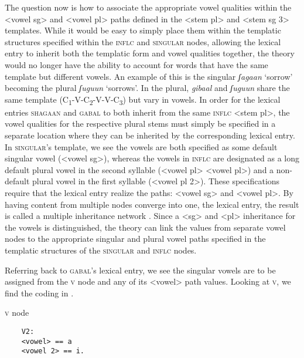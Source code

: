 \documentclass[output=paper,modfonts]{langscibook}
\begin{document}
The question now is how to associate the appropriate vowel qualities within the <vowel sg> and <vowel pl> paths defined in the <stem pl> and <stem sg 3> templates.  While it would be easy to simply place them within the templatic structures specified within the \textsc{inflc} and \textsc{singular} nodes, allowing the lexical entry to inherit both the templatic form and vowel qualities together, the theory would no longer have the ability to account for words that have the same template but different vowels. An example of this is the singular \textit{ʃagaan} ‘sorrow’ becoming the plural \textit{ʃuguun} ‘sorrows’. In the plural, \textit{gibaal} and \textit{ʃuguun} share the same template (C\textsubscript{1}{}-V-C\textsubscript{2}{}-V-V-C\textsubscript{3}) but vary in vowels. In order for the lexical entries \textsc{shagaan} and \textsc{gabal} to both inherit from the same \textsc{inflc} <stem pl>, the vowel qualities for the respective plural stems must simply be specified in a separate location where they can be inherited by the corresponding lexical entry. In \textsc{singular}’s template, we see the vowels are both specified as some default singular vowel (<vowel sg>), whereas the vowels in \textsc{inflc} are designated as a long default plural vowel in the second syllable (<vowel pl> <vowel pl>) and a non-default plural vowel in the first syllable (<vowel pl 2>). These specifications require that the lexical entry realize the paths: <vowel sg> and <vowel pl>. By having content from multiple nodes converge into one, the lexical entry, the result is called a multiple inheritance network \citep[202--203]{Evans1996}. Since a <sg> and <pl> inheritance for the vowels is distinguished, the theory can link the values from separate vowel nodes to the appropriate singular and plural vowel paths specified in the templatic structures of the \textsc{singular} and \textsc{inflc} nodes. 

Referring back to \textsc{gabal}’s lexical entry, we see the singular vowels are to be assigned from the \textsc{v} node and any of its <vowel> path values. Looking at \textsc{v}, we find the coding in .

\ea \textsc{v} node\\ \begin{lstlisting} 
    V2:
    <vowel> == a
    <vowel 2> == i.
\end{lstlisting}
\label{fig:winchester:4}
\z
\end{document}
